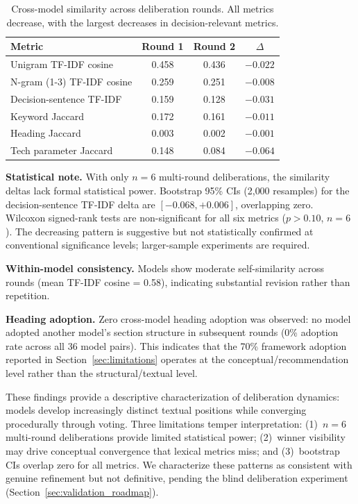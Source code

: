 \documentclass[11pt,a4paper]{article}
\begin{document}
\begin{table}[t]
\centering
\caption{Cross-model similarity across deliberation rounds. All metrics decrease, with the largest decreases in decision-relevant metrics.}
\label{tab:similarity}
\begin{tabular}{lccc}
\toprule
Metric & Round 1 & Round 2 & $\Delta$ \\
\midrule
Unigram TF-IDF cosine & 0.458 & 0.436 & $-0.022$ \\
N-gram (1-3) TF-IDF cosine & 0.259 & 0.251 & $-0.008$ \\
Decision-sentence TF-IDF & 0.159 & 0.128 & $-0.031$ \\
Keyword Jaccard & 0.172 & 0.161 & $-0.011$ \\
Heading Jaccard & 0.003 & 0.002 & $-0.001$ \\
Tech parameter Jaccard & 0.148 & 0.084 & $-0.064$ \\
\bottomrule
\end{tabular}
\end{table}

\textbf{Statistical note.} With only $n = 6$ multi-round deliberations, the similarity deltas lack formal statistical power. Bootstrap 95\% CIs (2{,}000 resamples) for the decision-sentence TF-IDF delta are $[-0.068, +0.006]$, overlapping zero. Wilcoxon signed-rank tests are non-significant for all six metrics ($p > 0.10$, $n = 6$). The decreasing pattern is suggestive but not statistically confirmed at conventional significance levels; larger-sample experiments are required.

\textbf{Within-model consistency.} Models show moderate self-similarity across rounds (mean TF-IDF cosine = 0.58), indicating substantial revision rather than repetition.

\textbf{Heading adoption.} Zero cross-model heading adoption was observed: no model adopted another model's section structure in subsequent rounds (0\% adoption rate across all 36 model pairs). This indicates that the 70\% framework adoption reported in Section~\ref{sec:limitations} operates at the conceptual/recommendation level rather than the structural/textual level.

These findings provide a descriptive characterization of deliberation dynamics: models develop increasingly distinct textual positions while converging procedurally through voting. Three limitations temper interpretation: (1)~$n = 6$ multi-round deliberations provide limited statistical power; (2)~winner visibility may drive conceptual convergence that lexical metrics miss; and (3)~bootstrap CIs overlap zero for all metrics. We characterize these patterns as consistent with genuine refinement but not definitive, pending the blind deliberation experiment (Section~\ref{sec:validation_roadmap}).
\end{document}
